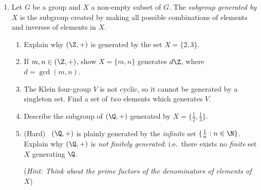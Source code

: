 \begin{exercises}
\begin{enumerate}
		
		\item\label{exs:finitegen} Let $G$ be a group and $X$ a non-empty subset of $G$. The \emph{subgroup generated by $X$} is the subgroup created by making all possible combinations of elements and inverses of elements in $X$.
		\begin{enumerate}
		  \item Explain why $(\Z,+)$ is generated by the set $X=\{2,3\}$.
		  \item If $m,n\in(\Z,+)$, show $X=\{m,n\}$ generates $d\Z$, where $d=\gcd(m,n)$.
		  \item The Klein four-group $V$ is not cyclic, so it cannot be generated by a singleton set. Find a set of \emph{two} elements which generates $V$.
		  \item Describe the subgroup of $(\Q,+)$ generated by $X=\{\frac 12,\frac 13\}$.
		  \item (Hard) \ $(\Q,+)$ is plainly generated by the \emph{infinite} set $\{\frac 1n:n\in\N\}$. Explain why $(\Q,+)$ is \emph{not finitely generated}: i.e.\ there exists no \emph{finite} set $X$ generating $\Q$.\par
		  (\emph{Hint: Think about the prime factors of the denominators of elements of $X$})
		\end{enumerate}

	
	\end{enumerate}
\end{exercises}





